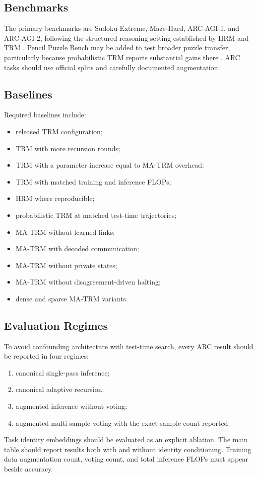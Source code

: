 \documentclass[10pt,a4paper,twocolumn]{article}
\newcommand{\MA}{\textsc{MA-TRM}}
\begin{document}
\subsection{Benchmarks}
The primary benchmarks are Sudoku-Extreme, Maze-Hard, ARC-AGI-1, and ARC-AGI-2, following the structured reasoning setting established by HRM and TRM \cite{wang2025hrm,jolicoeur2025trm}. Pencil Puzzle Bench may be added to test broader puzzle transfer, particularly because probabilistic TRM reports substantial gains there \cite{sghaier2026ptrm}. ARC tasks should use official splits and carefully documented augmentation.

\subsection{Baselines}
Required baselines include:
\begin{itemize}
\item released TRM configuration;
\item TRM with more recursion rounds;
\item TRM with a parameter increase equal to \MA{} overhead;
\item TRM with matched training and inference FLOPs;
\item HRM where reproducible;
\item probabilistic TRM at matched test-time trajectories;
\item \MA{} without learned links;
\item \MA{} with decoded communication;
\item \MA{} without private states;
\item \MA{} without disagreement-driven halting;
\item dense and sparse \MA{} variants.
\end{itemize}

\subsection{Evaluation Regimes}
To avoid confounding architecture with test-time search, every ARC result should be reported in four regimes:
\begin{enumerate}[label=(\alph*)]
\item canonical single-pass inference;
\item canonical adaptive recursion;
\item augmented inference without voting;
\item augmented multi-sample voting with the exact sample count reported.
\end{enumerate}
Task identity embeddings should be evaluated as an explicit ablation. The main table should report results both with and without identity conditioning. Training data augmentation count, voting count, and total inference FLOPs must appear beside accuracy.
\end{document}

